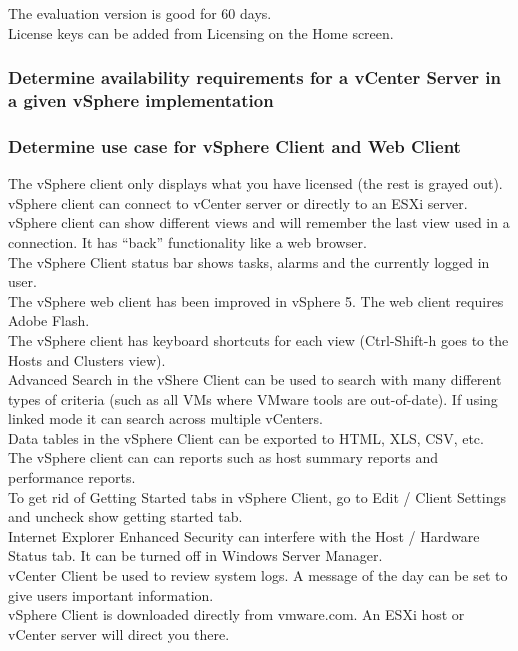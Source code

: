 The evaluation version is good for 60 days.\\

License keys can be added from Licensing on the Home screen.

\subsubsection{Determine availability requirements for a vCenter Server in a given vSphere implementation}

\subsubsection{Determine use case for vSphere Client and Web Client}

The vSphere client only displays what you have licensed (the rest is grayed
out).\\

vSphere client can connect to vCenter server or directly to an ESXi server.\\

vSphere client can show different views and will remember the last view used
in a connection. It has ``back'' functionality like a web browser.\\

The vSphere Client status bar shows tasks, alarms and the currently logged in
user.\\

The vSphere web client has been improved in vSphere 5. The web client requires Adobe Flash.\\

The vSphere client has keyboard shortcuts for each view (Ctrl-Shift-h goes to
the Hosts and Clusters view).\\

Advanced Search in the vShere Client can be used to search with many different
types of criteria (such as all VMs where VMware tools are out-of-date). If
using linked mode it can search across multiple vCenters.\\

Data tables in the vSphere Client can be exported to HTML, XLS, CSV, etc.\\

The vSphere client can can reports such as host summary reports and performance
reports.\\

To get rid of Getting Started tabs in vSphere Client, go to
Edit / Client Settings and uncheck show getting started tab.\\

Internet Explorer Enhanced Security can interfere with the Host / Hardware
Status tab. It can be turned off in Windows Server Manager.\\

vCenter Client be used to review system logs. A message of the day can be set
to give users important information.\\

vSphere Client is downloaded directly from vmware.com. An ESXi host or vCenter server
will direct you there.

